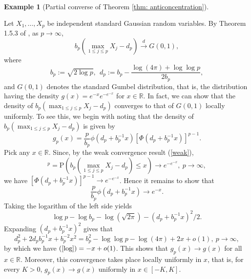 \documentclass[11pt,reqno]{amsart}
\theoremstyle{definition}
\newtheorem{example}{Example}
\renewcommand{\Pr}{{\mathrm{P}}}
\newcommand{\RR}{\mathbb{R}}
\begin{document}
\begin{example}[Partial converse of Theorem \ref{thm: anticoncentration}]
\label{ex1}

Let $X_{1},\dots,X_{p}$ be independent standard Gaussian random variables.
By Theorem 1.5.3 of \cite{Leadbetter1983},  as $p \to \infty$,
\begin{equation}
b_{p} (\max_{1 \leq j \leq p}X_{j} - d_{p}) \stackrel{d}{\to} G(0,1), \label{weak}
\end{equation}
where
\begin{equation*}
b_{p} := \sqrt{2 \log p},   \ \ d_{p} := b_{p} - \frac{ \log(4 \pi) + \log \log p }{2 b_{p}},
\end{equation*}
and $G(0,1)$ denotes the standard Gumbel distribution, that is, the distribution having the density $g(x) = e^{-x} e^{-e^{-x}}$ for $x \in \mathbb{R}$.
In fact, we can show that the density of $b_{p} (\max_{1 \leq j \leq p}X_{j} - d_{p})$ converges to that of $G(0,1)$ locally uniformly.
To see this, we begin with noting that the density of $b_{p} (\max_{1 \leq j \leq p}X_{j} - d_{p})$ is given by
\begin{equation*}
g_{p}(x) = \frac{p}{b_{p}}\phi(d_{p} + b_{p}^{-1}x) [\Phi(d_{p}+b_{p}^{-1}x)]^{p-1}.
\end{equation*}
Pick any $x \in \mathbb{R}$. Since, by the weak convergence result (\ref{weak}),
\begin{equation*}
[\Phi(d_{p}+b_{p}^{-1}x)]^p =\Pr(b_{p} (\max_{1 \leq j \leq p}X_{j} - d_{p})\leq x) \to e^{-e^{-x}}, \ p \to \infty,
\end{equation*}
we have $[\Phi(d_{p}+b_{p}^{-1}x)]^{p-1} \to e^{-e^{-x}}$. Hence it remains to show that
\begin{equation*}
\frac{p}{b_{p}}\phi(d_{p} + b_{p}^{-1}x) \to e^{-x}.
\end{equation*}
Taking the logarithm of the left side yields
\begin{equation}
\log p -\log b_{p} - \log (\sqrt{2\pi}) - (d_{p}+b_{p}^{-1}x)^{2}/2. \label{log}
\end{equation}
Expanding $(d_{p}+b_{p}^{-1}x)^{2}$ gives that
\begin{equation*}
d_{p}^{2} + 2 d_{p} b_{p}^{-1}x + b_{p}^{-2}x^{2} = b_{p}^{2} - \log \log p - \log (4\pi) + 2x + o(1), \ p \to \infty,
\end{equation*}
by which we have $(\ref{log}) = -x + o(1)$. This shows that $g_{p}(x) \to g(x)$ for all $x \in \RR$.
Moreover, this convergence takes place locally uniformly in $x$, that is, for every $K > 0$, $g_{p}(x) \to g(x)$ uniformly in $x \in [-K, K]$.


\end{example}
\end{document}
